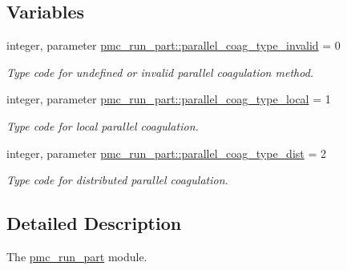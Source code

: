 \subsection*{Variables}
\begin{DoxyCompactItemize}
\item 
integer, parameter \mbox{\hyperlink{namespacepmc__run__part_a278a5ae0d4e066b778b5d58f6a95679c}{pmc\+\_\+run\+\_\+part\+::parallel\+\_\+coag\+\_\+type\+\_\+invalid}} = 0
\begin{DoxyCompactList}\small\item\em Type code for undefined or invalid parallel coagulation method. \end{DoxyCompactList}\item 
integer, parameter \mbox{\hyperlink{namespacepmc__run__part_a17a6185240300cc792ac0542cfcf0437}{pmc\+\_\+run\+\_\+part\+::parallel\+\_\+coag\+\_\+type\+\_\+local}} = 1
\begin{DoxyCompactList}\small\item\em Type code for local parallel coagulation. \end{DoxyCompactList}\item 
integer, parameter \mbox{\hyperlink{namespacepmc__run__part_a0225a153cd9f702143b136eee13adc47}{pmc\+\_\+run\+\_\+part\+::parallel\+\_\+coag\+\_\+type\+\_\+dist}} = 2
\begin{DoxyCompactList}\small\item\em Type code for distributed parallel coagulation. \end{DoxyCompactList}\end{DoxyCompactItemize}


\subsection{Detailed Description}
The \mbox{\hyperlink{namespacepmc__run__part}{pmc\+\_\+run\+\_\+part}} module. 

